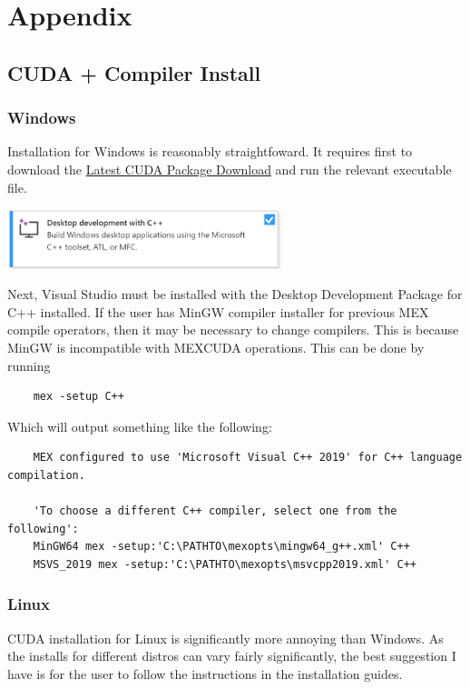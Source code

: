 \documentclass[11pt,letterpaper]{article}
\renewcommand{\\}{\bigskip}
\begin{document}
\section{Appendix}

\subsection{CUDA + Compiler Install}

\label{sec:compilerinstall}
\subsubsection{Windows}
Installation for Windows is reasonably straightfoward. It requires first to download the \href{https://developer.nvidia.com/cuda-downloads?target_os=Windows&target_arch=x86_64}{Latest CUDA Package Download} and run the relevant executable file.\\

\begin{center}
    \includegraphics[width = 0.6\textwidth]{Windows_Compiler.png}
\end{center}

Next, Visual Studio must be installed with the Desktop Development Package for C++ installed. If the user has MinGW compiler installer for previous MEX compile operators, then it may be necessary to change compilers. This is because MinGW is incompatible with MEXCUDA operations. This can be done by running

\begin{verbatim}
    mex -setup C++
\end{verbatim}

Which will output something like the following:

\begin{verbatim}
    MEX configured to use 'Microsoft Visual C++ 2019' for C++ language compilation.

    'To choose a different C++ compiler, select one from the following':
    MinGW64 mex -setup:'C:\PATHTO\mexopts\mingw64_g++.xml' C++
    MSVS_2019 mex -setup:'C:\PATHTO\mexopts\msvcpp2019.xml' C++ 
\end{verbatim}


\subsubsection{Linux}
CUDA installation for Linux is significantly more annoying than Windows. As the installs for different distros can vary fairly significantly, the best suggestion I have is for the user to follow the instructions in the installation guides.\\
\end{document}
